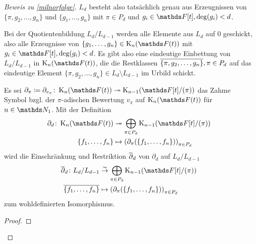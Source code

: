 \documentclass[ngerman,fontsize=11pt, paper=a4, parskip=half, titlepage=true, toc=bib]{scrartcl}
\begin{document}
\begin{proof}[Beweis zu \ref{milnorfolge}]
  $L_d$ besteht also tatsächlich genau aus Erzeugnissen von
  $\{\pi,g_2,\dotsc,g_n\}$ und $\{g_1,\dotsc,g_n\}$
  mit $\pi\in P_d$ und $g_i\in\F[t], \deg(g_i)<d$.

  Bei der Quotientenbildung $L_d/L_{d-1}$ werden alle Elemente aus
  $L_d$ auf $0$ geschickt, also alle Erzeugnisse von
  $\{g_1,\dotsc,g_n\}\in\KnFt$ mit $g_i\in\F[t], \deg(g_i)<d$.
  Es gibt also eine eindeutige Einbettung von $L_d/L_{d-1}$ in
  $\KnFt$, die die Restklassen $\overline{\{\pi,g_2,\dotsc,g_n\}}, \pi\in
  P_d$ auf das eindeutige Element 
  $\{\pi,g_2,\dotsc,g_n\}\in L_d\setminus L_{d-1}$
  im Urbild schickt.

  \begin{Lem}[\ref{2}]
    Es sei $\partial_\pi\coloneqq \partial_{v_\pi}\colon
    \KnFt\twoheadrightarrow\K_{n-1}(\Ftpi)$
    das Zahme Symbol bzgl. der $\pi$-adischen Bewertung $v_\pi$ auf
    $\KnFt$ für $n\in\N_1$.
    Mit der Definition
    \begin{align*}
      \partial_d\colon \KnFt
      &\twoheadrightarrow \bigoplus_{\pi\in
        P_d}\K_{n-1}(\Ftpi)\\
      \{f_1,\dotsc,f_n\}
      &\mapsto\left(
        \partial_\pi(\{f_1,\dotsc,f_n\})
        \right)_{\pi\in P_d}
    \end{align*}
    wird die Einschränkung und Restriktion $\overline{\partial}_d$ 
    von $\partial_d$ auf $L_d/L_{d-1}$
    \begin{align*}
      \ov{\partial}_d\colon L_d/L_{d-1}
      &\overset{\thicksim}{\rightarrow} \bigoplus_{\pi\in
        P_d}\K_{n-1}(\Ftpi)\\
      \ov{\{f_1,\dotsc,f_n\}}
      &\mapsto\left(
        \partial_\pi(\{f_1,\dotsc,f_n\})
        \right)_{\pi\in P_d}
    \end{align*}
    zum wohldefinierten Isomorphismus.
  \end{Lem}
  \begin{proof}

\end{proof}
\end{proof}
\end{document}
